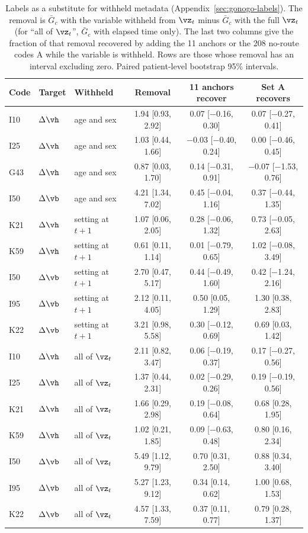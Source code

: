\begin{table}[t]
\caption{Labels as a substitute for withheld metadata (Appendix~\ref{sec:gonogo-labels}). The removal is $\bar G_c$ with the variable withheld from $\vz_t$ minus $\bar G_c$ with the full $\vz_t$ (for ``all of $\vz_t$'', $\bar G_c$ with elapsed time only). The last two columns give the fraction of that removal recovered by adding the 11 anchors or the 208 no-route codes A while the variable is withheld. Rows are those whose removal has an interval excluding zero. Paired patient-level bootstrap 95\% intervals.}
\label{tab:gonogo-substitute}
\centering
\small
\begin{tabular}{@{}lll ccc@{}}
\toprule
\textbf{Code} & \textbf{Target} & \textbf{Withheld} & \textbf{Removal} & \textbf{11 anchors recover} & \textbf{Set A recovers} \\
\midrule
I10 & $\Delta\vh$ & age and sex & 1.94 [0.93, 2.92] & 0.07 [$-$0.16, 0.30] & 0.07 [$-$0.27, 0.41] \\
I25 & $\Delta\vh$ & age and sex & 1.03 [0.44, 1.66] & $-$0.03 [$-$0.40, 0.24] & 0.00 [$-$0.46, 0.45] \\
G43 & $\Delta\vh$ & age and sex & 0.87 [0.03, 1.70] & 0.14 [$-$0.31, 0.91] & $-$0.07 [$-$1.53, 0.76] \\
I50 & $\Delta\vb$ & age and sex & 4.21 [1.34, 7.02] & 0.45 [$-$0.04, 1.16] & 0.37 [$-$0.44, 1.35] \\
\addlinespace
K21 & $\Delta\vh$ & setting at $t+1$ & 1.07 [0.06, 2.05] & 0.28 [$-$0.06, 1.32] & 0.73 [$-$0.05, 2.63] \\
K59 & $\Delta\vh$ & setting at $t+1$ & 0.61 [0.11, 1.14] & 0.01 [$-$0.79, 0.65] & 1.02 [$-$0.08, 3.49] \\
I50 & $\Delta\vb$ & setting at $t+1$ & 2.70 [0.47, 5.17] & 0.44 [$-$0.49, 1.60] & 0.42 [$-$1.24, 2.16] \\
I95 & $\Delta\vb$ & setting at $t+1$ & 2.12 [0.11, 4.05] & 0.50 [0.05, 1.29] & 1.30 [0.38, 2.83] \\
K22 & $\Delta\vb$ & setting at $t+1$ & 3.21 [0.98, 5.58] & 0.30 [$-$0.12, 0.69] & 0.69 [0.03, 1.42] \\
\addlinespace
I10 & $\Delta\vh$ & all of $\vz_t$ & 2.11 [0.82, 3.47] & 0.06 [$-$0.19, 0.37] & 0.17 [$-$0.27, 0.56] \\
I25 & $\Delta\vh$ & all of $\vz_t$ & 1.37 [0.44, 2.31] & 0.02 [$-$0.29, 0.26] & 0.19 [$-$0.19, 0.56] \\
K21 & $\Delta\vh$ & all of $\vz_t$ & 1.66 [0.29, 2.98] & 0.19 [$-$0.08, 0.64] & 0.68 [0.28, 1.95] \\
K59 & $\Delta\vh$ & all of $\vz_t$ & 1.02 [0.21, 1.85] & 0.09 [$-$0.63, 0.48] & 0.80 [0.16, 2.34] \\
I50 & $\Delta\vb$ & all of $\vz_t$ & 5.49 [1.12, 9.79] & 0.70 [0.31, 2.50] & 0.88 [0.34, 3.40] \\
I95 & $\Delta\vb$ & all of $\vz_t$ & 5.27 [1.23, 9.12] & 0.34 [0.14, 0.62] & 1.00 [0.68, 1.53] \\
K22 & $\Delta\vb$ & all of $\vz_t$ & 4.57 [1.33, 7.59] & 0.37 [0.11, 0.77] & 0.79 [0.28, 1.37] \\
\bottomrule
\end{tabular}
\end{table}

